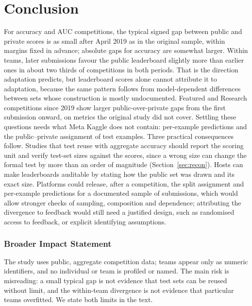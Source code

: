\documentclass[10pt]{article}
\begin{document}
\section{Conclusion}

For accuracy and AUC competitions, the typical signed gap between public and private scores is as small after April 2019 as in the original sample, within margins fixed in advance; absolute gaps for accuracy are somewhat larger. Within teams, later submissions favour the public leaderboard slightly more than earlier ones in about two thirds of competitions in both periods. That is the direction adaptation predicts, but leaderboard scores alone cannot attribute it to adaptation, because the same pattern follows from model-dependent differences between sets whose construction is mostly undocumented. Featured and Research competitions since 2019 show larger public-over-private gaps from the first submission onward, on metrics the original study did not cover. Settling these questions needs what Meta Kaggle does not contain: per-example predictions and the public--private assignment of test examples. Three practical consequences follow. Studies that test reuse with aggregate accuracy should report the scoring unit and verify test-set sizes against the scores, since a wrong size can change the formal test by more than an order of magnitude (Section~\ref{sec:recon}). Hosts can make leaderboards auditable by stating how the public set was drawn and its exact size. Platforms could release, after a competition, the split assignment and per-example predictions for a documented sample of submissions, which would allow stronger checks of sampling, composition and dependence; attributing the divergence to feedback would still need a justified design, such as randomised access to feedback, or explicit identifying assumptions.

\subsubsection*{Broader Impact Statement}
The study uses public, aggregate competition data; teams appear only as numeric identifiers, and no individual or team is profiled or named. The main risk is misreading: a small typical gap is not evidence that test sets can be reused without limit, and the within-team divergence is not evidence that particular teams overfitted. We state both limits in the text.
\end{document}
